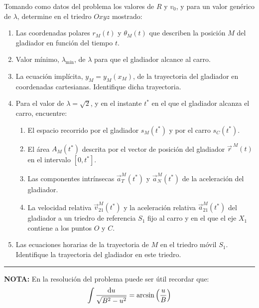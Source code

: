 \documentclass{article}
\begin{document}
\begin{mybox}
    Tomando como datos del problema los valores de $R$ y $v_0$, y para un valor genérico de $\lambda $, determine en el triedro $Oxyz$ mostrado:
    \begin{enumerate}
        \item Las coordenadas polares $r_M(t)$ y $\theta _M(t)$ que describen la posición $M$ del gladiador en función del tiempo $t$.
        \item Valor mínimo, $\lambda _\text{mín}$, de $\lambda $ para que el gladiador alcance al carro.
        \item La ecuación implícita, $y_M=y_M(x_M)$, de la trayectoria del gladiador en coordenadas cartesianas. Identifique dicha trayectoria.
        \item Para el valor de $\lambda=\sqrt{2}$, y en el instante $t^*$ en el que el gladiador alcanza el carro, encuentre:
        \begin{enumerate}
            \item El espacio recorrido por el gladiador $s_M(t^*)$ y por el carro $s_C(t^*)$.
            \item El área $A_M(t^*)$ descrita por el vector de posición del gladiador $\vec{r}^{\ M}(t)$ en el intervalo $[0,t^*]$.
            \item Las componentes intrínsecas $\vec{a}_T^M(t^*)$ y $\vec{a}_N^M(t^*)$ de la aceleración del gladiador.
            \item La velocidad relativa $\vec{v}_{21}^M(t^*)$ y la aceleración relativa $\vec{a}_{21}^M(t^*)$ del gladiador a un triedro de referencia $S_1$ fijo al carro y en el que el eje $X_1$ contiene a los puntos $O$ y $C$.
        \end{enumerate}
        \item Las ecuaciones horarias de la trayectoria de $M$ en el triedro móvil $S_1$. Identifique la trayectoria del gladiador en este triedro.
    \end{enumerate}
    \noindent\rule{\textwidth}{0.5pt}
    \textbf{NOTA:} En la resolución del problema puede ser útil recordar que:
    $$
    \int \frac{\odif{u}}{\sqrt{B^2-u^2}}=\arcsin{\left (  \frac{u}{B}\right )}
    $$
\end{mybox}
\end{document}
